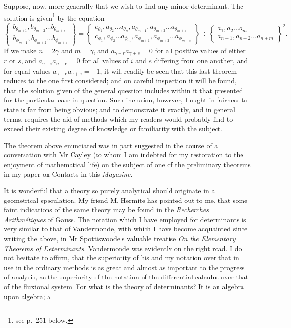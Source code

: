 \documentclass[11pt]{article}
\newcommand{\bd}[2]{\left\{\begin{matrix}#1\\#2\end{matrix}\right\}}
\begin{document}
{{Suppose, now, more generally that we wish to find any minor determinant. The solution is given\footnote{see p.~251 below.} by the equation
\[
\bd{b_{\theta_{m+1}},b_{\theta_{m+2}}\ldots b_{\theta_{m+s}}}{b_{\phi_{m+1}},b_{\phi_{m+2}}\ldots b_{\phi_{m+s}}}
=
\bd{a_{\theta_1},a_{\theta_2}\ldots a_{\theta_n},a_{\theta_{m+1}},a_{\theta_{m+2}}\ldots a_{\theta_{m+s}}}{a_{\phi_1},a_{\phi_2}\ldots a_{\phi_m},a_{\phi_{m+1}},a_{\phi_{m+2}}\ldots a_{\phi_{m+s}}}
\div
\bd{a_1,a_2\ldots a_m}{a_{n+1},a_{n+2}\ldots a_{n+m}}^2.
\tag{3}
\]
If we make $n=2\gamma$ and $m=\gamma$, and $a_{\gamma+r}a_{\gamma+s}=0$ for all positive values of either $r$ or $s$, and $a_{\gamma-i}a_{n+e}=0$ for all values of $i$ and $e$ differing from one another, and for equal values $a_{\gamma-e}a_{\gamma+e}=-1$, it will readily be seen that this last theorem reduces to the one first considered; and on careful inspection it will be found, that the solution given of the general question includes within it that presented for the particular case in question. Such inclusion, however, I ought in fairness to state is far from being obvious; and to demonstrate it exactly, and in general terms, requires the aid of methods which my readers would probably find to exceed their existing degree of knowledge or familiarity with the subject.

The theorem above enunciated was in part suggested in the course of a conversation with Mr Cayley (to whom I am indebted for my restoration to the enjoyment of mathematical life) on the subject of one of the preliminary theorems in my paper on Contacts in this \emph{Magazine}.

It is wonderful that a theory so purely analytical should originate in a geometrical speculation. My friend M. Hermite has pointed out to me, that some faint indications of the same theory may be found in the \emph{Recherches Arithmétiques} of Gauss. The notation which I have employed for determinants is very similar to that of Vandermonde, with which I have become acquainted since writing the above, in Mr Spottiswoode's valuable treatise \emph{On the Elementary Theorems of Determinants}. Vandermonde was evidently on the right road. I do not hesitate to affirm, that the superiority of his and my notation over that in use in the ordinary methods is as great and almost as important to the progress of analysis, as the superiority of the notation of the differential calculus over that of the fluxional system. For what is the theory of determinants? It is an algebra upon algebra; a

}}
\end{document}
